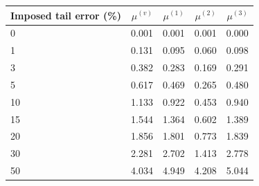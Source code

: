 \begin{tabular}{l|rrrr}
\toprule
Imposed tail error (\%) & $\mu^{(v)}$ & $\mu^{(1)}$ & $\mu^{(2)}$ & $\mu^{(3)}$ \\
\midrule
0 & 0.001 & 0.001 & 0.001 & 0.000 \\
1 & 0.131 & 0.095 & 0.060 & 0.098 \\
3 & 0.382 & 0.283 & 0.169 & 0.291 \\
5 & 0.617 & 0.469 & 0.265 & 0.480 \\
10 & 1.133 & 0.922 & 0.453 & 0.940 \\
15 & 1.544 & 1.364 & 0.602 & 1.389 \\
20 & 1.856 & 1.801 & 0.773 & 1.839 \\
30 & 2.281 & 2.702 & 1.413 & 2.778 \\
50 & 4.034 & 4.949 & 4.208 & 5.044 \\
\bottomrule
\end{tabular}

